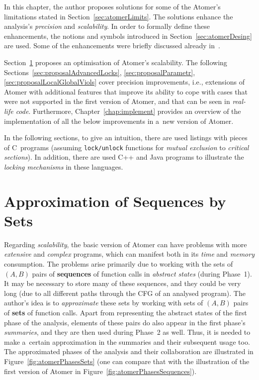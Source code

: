 In this chapter, the author proposes solutions for some of the Atomer's limitations stated in Section~\ref{sec:atomerLimits}. The solutions enhance the analysis's \emph{precision} and \emph{scalability}. In order to formally define these enhancements, the notions and symbols introduced in Section~\ref{sec:atomerDesing} are used. Some of the enhancements were briefly discussed already in~\cite{excel2021Harmim}.

Section~\ref{sec:proposalSets} proposes an optimisation of Atomer's scalability. The following Sections~\ref{sec:proposalAdvancedLocks}, \ref{sec:proposalParametr}, \ref{sec:proposalLocalGlobalViols} cover precision improvements, i.e., extensions of Atomer with additional features that improve its ability to cope with cases that were not supported in the first version of Atomer, and that can be seen in \emph{real-life code}. Furthermore, Chapter~\ref{chap:implement} provides an overview of the implementation of all the below improvements in a~new version of Atomer.

In the following sections, to give an intuition, there are used listings with pieces of C~programs (assuming \texttt{lock/unlock} functions for \emph{mutual exclusion} to \emph{critical sections}). In addition, there are used C++ and Java programs to illustrate the \emph{locking mechanisms} in these languages.


\section{Approximation of Sequences by Sets}
\label{sec:proposalSets}

Regarding \emph{scalability}, the basic version of Atomer can have problems with more \emph{extensive} and \emph{complex} programs, which can manifest both in its \emph{time} and \emph{memory} consumption. The problems arise primarily due to working with the sets of $ (A, B) $ pairs of \textbf{sequences} of function calls in \emph{abstract states} (during Phase~1). It may be necessary to store many of these sequences, and they could be very long (due to all different paths through the CFG of an analysed program). The author's idea is to \emph{approximate} these sets by working with sets of $ (A, B) $ pairs of \textbf{sets} of function calls. Apart from representing the abstract states of the first phase of the analysis, elements of these pairs do also appear in the first phase's \emph{summaries}, and they are then used during Phase~2 as well. Thus, it is needed to make a~certain approximation in the summaries and their subsequent usage too. The approximated phases of the analysis and their collaboration are illustrated in Figure~\ref{fig:atomerPhasesSets} (one can compare that with the illustration of the first version of Atomer in Figure~\ref{fig:atomerPhasesSequences}).

